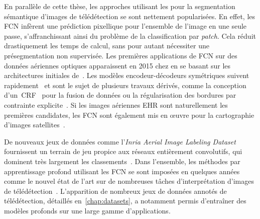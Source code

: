 En parallèle de cette thèse, les approches utilisant les  pour la segmentation sémantique d'images de télédétection se sont nettement popularisées. En effet, les \gls{FCN} infèrent une prédiction pixellique pour l'ensemble de l'image en une seule passe, s'affranchissant ainsi du problème de la classification par \emph{patch}. Cela réduit drastiquement les temps de calcul, sans pour autant nécessiter une présegmentation non supervisée. Les premières applications de \gls{FCN} sur des données aériennes optiques apparaissent en 2015 chez \citet{paisitkriangkrai_effective_2015,sherrah_fully_2016} en se basant sur les architectures initiales de~\citet{long_fully_2015}. Les modèles encodeur-décodeurs symétriques suivent rapidement~\cite{volpi_dense_2017,audebert_semantic_2016} et sont le sujet de plusieurs travaux dérivés, comme la conception d'un~\gls{CRF}~\cite{liu_dense_2017} pour la fusion de données ou la régularisation des bordures par contrainte explicite~\cite{marmanis_classification_2017}. Si les images aériennes \gls{EHR} sont naturellement les premières candidates, les \gls{FCN} sont également mis en \oe{}uvre pour la cartographie d'images satellites~\cite{fu_classification_2017}.

De nouveaux jeux de données comme l'\emph{Inria Aerial Image Labeling Dataset} fournissent un terrain de jeu propice aux réseaux entièrement convolutifs, qui dominent très largement les classements~\cite{huang_large-scale_2018}. Dans l'ensemble, les méthodes par apprentissage profond utilisant les \gls{FCN} se sont imposées en quelques années comme le nouvel état de l'art sur de nombreuses tâches d'interprétation d'images de télédétection~\cite{liu_comparing_2018}. L'apparition de nombreux jeux de données annotés de télédétection, détaillés en~\cref{chap:datasets}, a notamment permis d'entraîner des modèles profonds sur une large gamme d'applications.

%
%
\printbibliography[heading=subbibliography]
